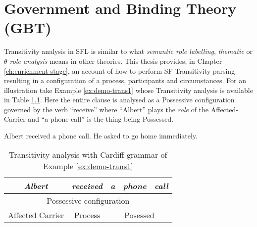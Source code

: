 \chapter{Government and Binding Theory (GBT)}
\label{ch:gbt}



Transitivity analysis in SFL is similar to what \textit{semantic role labelling}, \textit{thematic}  or  \textit{$\theta$ role analysis} means in other theories. This thesis provides, in Chapter \ref{ch:enrichment-stage}, an account of how to perform SF Transitivity parsing resulting in a configuration of a process, participants and circumstances. For an illustration take Example \ref{ex:demo-trans1} whose Transitivity analysis is available in Table \ref{tab:demo-trans1}. Here the entire clause is analysed as a Possessive configuration governed by the verb ``receive'' where ``Albert'' plays the \textit{role} of the Affected-Carrier and ``a phone call'' is the thing being Possessed.

\begin{exe}
    \ex\label{ex:demo-trans1} Albert received a phone call.
    \ex\label{ex:demo-trans2} He asked to go home immediately.
\end{exe}

\begin{table}[!ht]
    \centering
    \begin{tabular}{|c|c|c|c|c|}
        \hline
        \textit{Albert}  & \textit{received} & \textit{a} & \textit{phone} & \textit{call} \\ \hline
        \multicolumn{5}{|c|}{Possessive configuration}                                     \\ \hline
        Affected Carrier & Process           & \multicolumn{3}{c|}{Posessed}               \\ \hline
    \end{tabular}
    \caption{Transitivity analysis with Cardiff grammar of Example \ref{ex:demo-trans1}}
    \label{tab:demo-trans1}
\end{table}

